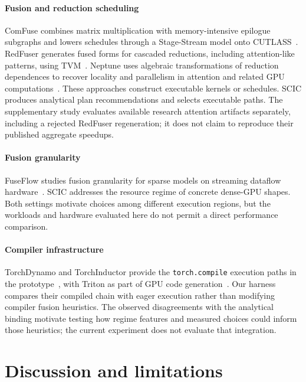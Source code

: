 \documentclass[a4paper,fleqn]{cas-dc}
\begin{document}
\paragraph{Fusion and reduction scheduling}
ComFuse combines matrix multiplication with memory-intensive epilogue subgraphs and lowers schedules through a Stage-Stream model onto CUTLASS~\cite{Mu2026ComFuse,NVIDIACutlass}.
RedFuser generates fused forms for cascaded reductions, including attention-like patterns, using TVM~\cite{Tang2026RedFuser,Chen2018TVM}.
Neptune uses algebraic transformations of reduction dependences to recover locality and parallelism in attention and related GPU computations~\cite{Zhao2026Neptune}.
These approaches construct executable kernels or schedules.
SCIC produces analytical plan recommendations and selects executable paths. The supplementary study evaluates available research attention artifacts separately, including a rejected RedFuser regeneration; it does not claim to reproduce their published aggregate speedups.

\paragraph{Fusion granularity}
FuseFlow studies fusion granularity for sparse models on streaming dataflow hardware~\cite{Lacouture2026FuseFlow}.
SCIC addresses the resource regime of concrete dense-GPU shapes.
Both settings motivate choices among different execution regions, but the workloads and hardware evaluated here do not permit a direct performance comparison.

\paragraph{Compiler infrastructure}
TorchDynamo and TorchInductor provide the \texttt{torch.compile} execution paths in the prototype~\cite{Ansel2024PyTorch2}, with Triton as part of GPU code generation~\cite{Tillet2019Triton}.
Our harness compares their compiled chain with eager execution rather than modifying compiler fusion heuristics.
The observed disagreements with the analytical binding motivate testing how regime features and measured choices could inform those heuristics; the current experiment does not evaluate that integration.

\section{Discussion and limitations}
\label{sec:limits}
\end{document}
